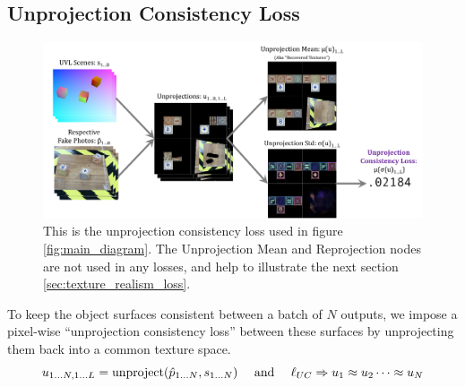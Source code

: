\documentclass{article}
\begin{document}
\subsection{Unprojection Consistency Loss}
\label{sec:unprojection_consistency_loss}

	\begin{figure}[H]
		\begin{center}
			\includegraphics[width=400pt]{../images/unprojection_consistency_loss_without_reprojection.pdf}
		\end{center}
		\caption{
			This is the unprojection consistency loss used in figure \ref{fig:main_diagram}.
			The Unprojection Mean and Reprojection nodes are not used in any losses, and help to illustrate the next section \ref{sec:texture_realism_loss}.
		}
		\label{fig:unprojection_consistency_loss}
	\end{figure}

	To keep the object surfaces consistent between a batch of $N$ outputs, we impose a pixel-wise ``unprojection consistency loss'' between these surfaces by unprojecting them back into a common texture space.
	\begin{equation}
		u\toNL=\text{unproject}(\ph\toN,s\toN)\ \ \ \text{ and } \ \ \ \lUC \Rightarrow u_1 \approx u_2 \dots \approx u_N
	\end{equation}
\end{document}
